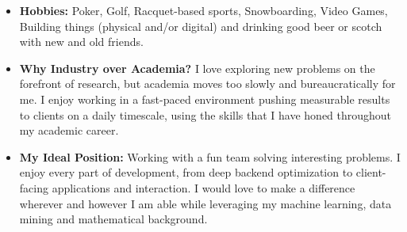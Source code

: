 \documentclass[letterpaper,1opt]{article}
\begin{document}
		\begin{itemize}

		\item {\bf Hobbies:} Poker, Golf, Racquet-based sports, Snowboarding, Video Games, Building things (physical and/or digital) and drinking good beer or scotch with new and old friends.

		\item {\bf Why Industry over Academia?} I love exploring new problems on the forefront of research, but academia moves too slowly and bureaucratically for me. I enjoy working in a fast-paced environment pushing measurable results to clients on a daily timescale, using the skills that I have honed throughout my academic career.

		\item {\bf My Ideal Position:} Working with a fun team solving interesting problems. I enjoy every part of development, from deep backend optimization to client-facing applications and interaction. I would love to make a difference wherever and however I am able while leveraging my machine learning, data mining and mathematical background.

		\end{itemize}
\end{document}
